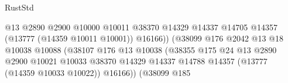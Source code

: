 \begin{lexlean}{RustStd}
\begin{coremodule}
                                                          @13
                                                          @2890
                                                          @2900
                                                          @10000
                                                          @10011
                                                          @38370
                                                          @14329
                                                          @14337
                                                          @14705
                                                          @14357
                                                          (@13777 (@14359 @10011 @10001))
                                                          @16166))
                                                      (@38099
                                                        @176
                                                        @2042
                                                        @13
                                                        @18
                                                        @10038
                                                        @10088
                                                        (@38107
                                                          @176
                                                          @13
                                                          @10038
                                                          (@38355
                                                            @175
                                                            @24
                                                            @13
                                                            @2890
                                                            @2900
                                                            @10021
                                                            @10033
                                                            @38370
                                                            @14329
                                                            @14337
                                                            @14788
                                                            @14357
                                                            (@13777 (@14359 @10033 @10022))
                                                            @16166))
                                                        (@38099
                                                          @185

\end{coremodule}
\end{lexlean}
